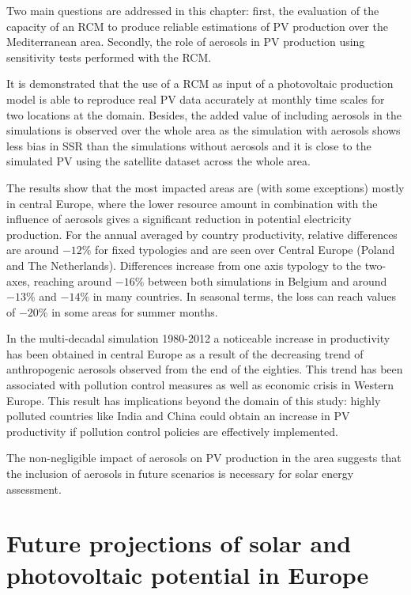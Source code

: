 Two main questions are addressed in this chapter: first, the evaluation of the capacity of an RCM to produce reliable estimations of PV production over the Mediterranean area. Secondly, the role of aerosols in PV production using sensitivity tests performed with the RCM. 

It is demonstrated that the use of a RCM as input of a photovoltaic production model is able to reproduce real PV data accurately at monthly time scales for two locations at the domain. Besides, the added value of including aerosols in the simulations is observed over the whole area as the simulation with aerosols shows less bias in SSR than the simulations without aerosols and it is close to the simulated PV using the satellite dataset across the whole area. 

The results show that the most impacted areas are (with some exceptions) mostly in central Europe, where the lower resource amount in combination with the influence of aerosols gives a significant reduction in potential electricity production. For the annual averaged by country productivity, relative differences are around $-12\%$ for fixed typologies and are seen over Central Europe (Poland and The Netherlands). Differences increase from one axis typology to the two-axes, reaching around $-16\%$ between both simulations in Belgium and around $-13\%$ and $-14\%$ in many countries. In seasonal terms, the loss can reach values of $-20\%$ in some areas for summer months.

In the multi-decadal simulation 1980-2012 a noticeable increase in productivity has been obtained in central Europe as a result of the decreasing trend of anthropogenic aerosols observed from the end of the eighties. This trend has been associated with pollution control measures as well as economic crisis in Western Europe. This result has implications beyond the domain of this study: highly polluted countries like India and China could obtain an increase in PV productivity if pollution control policies are effectively implemented.

The non-negligible impact of aerosols on PV production in the area suggests that the inclusion of aerosols in future scenarios is necessary for solar energy assessment.

\chapter{Future projections of solar and photovoltaic  potential  in Europe}

